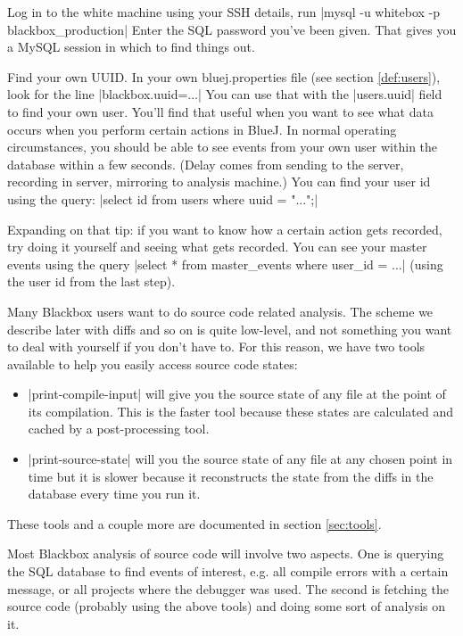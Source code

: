 \documentclass{report}
\begin{document}
Log in to the white machine using your SSH details, run |mysql -u whitebox -p blackbox_production|
Enter the SQL password you've been given.  That gives you a MySQL session in which
to find things out.

Find your own UUID.  In your own bluej.properties file (see section \ref{def:users}),
look for the line |blackbox.uuid=...|  You can use that with the |users.uuid| field
to find your own user.  You'll find that useful when you want to see what data occurs
when you perform certain actions in BlueJ.  In normal operating circumstances, you should
be able to see events from your own user within the database within a few seconds.
(Delay comes from sending to the server, recording in server, mirroring to analysis machine.)
You can find your user id using the query: |select id from users where uuid = "...";|

Expanding on that tip: if you want to know how a certain action gets recorded, try doing
it yourself and seeing what gets recorded.  You can see your master events using the query
|select * from master_events where user_id = ...| (using the user id from the last step).

Many Blackbox users want to do source code related analysis.  The scheme we describe later
with diffs and so on is quite low-level, and not something you want to deal with yourself
if you don't have to.  For this reason, we have two tools available to help you easily
access source code states:
\begin{itemize}
\item |print-compile-input| will give you the source state of any file at the point
of its compilation.  This is the faster tool because these states are calculated and cached
by a post-processing tool.
\item |print-source-state| will you the source state of any file at any chosen point in time
but it is slower because it reconstructs the state from the diffs in the database every time
you run it.
\end{itemize}

These tools and a couple more are documented in section \ref{sec:tools}.

Most Blackbox analysis of source code will involve two aspects.  One is querying the SQL
database to find events of interest, e.g. all compile errors with a certain message, or
all projects where the debugger was used.  The second is fetching the source code (probably
using the above tools) and doing some sort of analysis on it.
\end{document}
